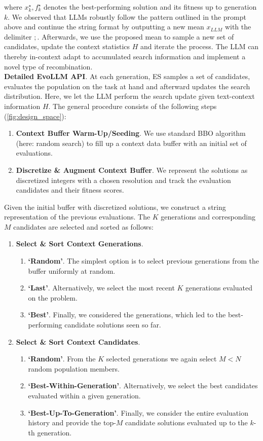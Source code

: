 \documentclass[sigconf]{acmart}
\begin{document}
where $x^\star_k, f^\star_k$  denotes the best-performing solution and its fitness up to generation $k$. We observed that LLMs robustly follow the pattern outlined in the prompt above and continue the string format by outputting a new mean $x_{LLM}$ with the delimiter $;$. Afterwards, we use the proposed mean to sample a new set of candidates, update the context statistics $H$ and iterate the process. The LLM can thereby in-context adapt to accumulated search information and implement a novel type of recombination.\\
\textbf{Detailed EvoLLM API}. At each generation, ES samples a set of candidates, evaluates the population on the task at hand and afterward updates the search distribution. Here, we let the LLM perform the search update given text-context information $H$. The general procedure consists of the following steps (\cref{fig:design_space}):
\begin{enumerate}
    \item \textbf{Context Buffer Warm-Up/Seeding}. We use standard BBO algorithm (here: random search) to fill up a context data buffer with an initial set of evaluations.
    \item \textbf{Discretize \& Augment Context Buffer}. We represent the solutions as discretized integers with a chosen resolution and track the evaluation candidates and their fitness scores.
\end{enumerate}
Given the initial buffer with discretized solutions, we construct a string representation of the previous evaluations. The $K$ generations and corresponding $M$ candidates are selected and sorted as follows:
\begin{enumerate}[resume]
    \item \textbf{Select \& Sort Context Generations}.
    \begin{enumerate}
        \item \textbf{`Random'}. The simplest option is to select previous generations from the buffer uniformly at random.
        \item \textbf{`Last'}. Alternatively, we select the most recent $K$ generations evaluated on the problem.
        \item \textbf{`Best'}. Finally, we considered the generations, which led to the best-performing candidate solutions seen so far.
    \end{enumerate}
    \item \textbf{Select \& Sort Context Candidates}.
    \begin{enumerate}
        \item \textbf{`Random'}. From the $K$ selected generations we again select $M < N$ random population members.
        \item \textbf{`Best-Within-Generation'}. Alternatively, we select the best candidates evaluated within a given generation.
        \item \textbf{`Best-Up-To-Generation'}. Finally, we consider the entire evaluation history and provide the top-$M$ candidate solutions evaluated up to the $k$-th generation.
    \end{enumerate}
\end{enumerate}
\end{document}
